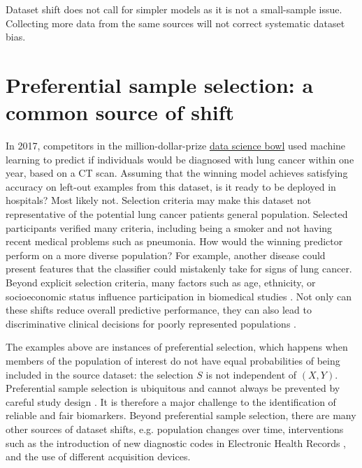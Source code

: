 \documentclass[twocolumn]{article}
\begin{document}
Dataset shift does not call for simpler models as it is not a small-sample
issue. Collecting more data from the same sources will not correct systematic dataset bias.


\section{Preferential sample selection: a common source of shift}
\label{sec:preferential-sample-selection}
%
%
In 2017, competitors in the million-dollar-prize
\href{https://www.kaggle.com/c/data-science-bowl-2017/overview}{data science
  bowl} used machine learning to predict if individuals would be diagnosed with
lung cancer within one year, based on a CT scan.
%
Assuming that the winning model achieves satisfying accuracy on left-out
examples from this dataset, is it ready to be deployed in hospitals? Most likely
not.
%
Selection criteria may 
make this dataset not 
representative of the potential lung cancer patients general population.
%
Selected participants verified many criteria, including being a smoker and not
having recent medical problems such as pneumonia. How would the winning
predictor perform on a more diverse population? For example, another disease
could present features that the classifier could mistakenly take for signs of lung
cancer.
%
Beyond explicit selection criteria, many factors such as age, ethnicity, or
socioeconomic status influence participation in biomedical studies
\citep{henrich2010most,murthy2004participation,heiat2002representation,chastain2020racial}.
%
Not only can these shifts reduce overall predictive performance, they can also
lead to discriminative clinical decisions for poorly represented populations
\citep{oakden2020hidden,gianfrancesco2018potential,barocas-hardt-narayanan,abbasi2020risk,cirillo2020sex}.
%

The examples above are instances of preferential selection, which happens when
members of the population of interest do not have equal probabilities of being
included in the source dataset: the selection \(S\) is not independent of \((X,
Y)\).
%
Preferential sample selection is ubiquitous and cannot always be prevented by
careful study design \citep{bareinboim2012controlling}. It is therefore a major
challenge to the identification of reliable and fair biomarkers.
%
Beyond preferential sample selection, there are many other sources of dataset
shifts, e.g. population changes over time, interventions such as the
introduction of new diagnostic codes in Electronic Health Records
\citep{saez2020ehrtemporalvariability}, and the use of different acquisition
devices.
%
\end{document}
